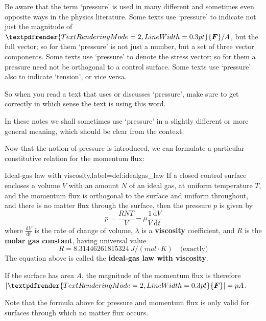 \documentclass[a4paper,12pt,%
onecolumn,oneside,titlepage,%
british%
]{memoir}
\providecommand{\href}[2]{#2}
\renewcommand*{\bm}[1]{\textpdfrender{TextRenderingMode=2,LineWidth=0.3pt}{\boldsymbol{#1}}}
\newcommand*{\di}{\mathrm{d}}%
\DeclarePairedDelimiter\abs{\lvert}{\rvert}
\renewcommand*{\|}[1][]{\nonscript\:#1\vert\nonscript\:\mathopen{}}
\newcommand*{\furl}[2]{\href{#1}{#2}\pagenote{\url{#1}}}
\newcommand*{\yN}{N}
\newcommand*{\yF}{\bm{F}}
\newcommand*{\yvis}{\mu}%
\newcommand*{\yte}{T}%
\begin{document}
\begin{warning}
  Be aware that the term \enquote*{pressure} is used in many different and sometimes even opposite ways in the physics literature. Some texts use \enquote*{pressure} to indicate not just the magnitude of $\yF/A$, but the full vector; so for them \enquote*{pressure} is not just a number, but a set of three vector components. Some texts use \enquote*{pressure} to denote the stress vector; so for them a pressure need not be orthogonal to a control surface. Some texts use \enquote*{pressure} also to indicate \enquote*{tension}, or vice versa.

  So when you read a text that uses or discusses \enquote*{pressure}, make sure to get correctly in which sense the text is using this word.

  In these notes we shall sometimes use \enquote*{pressure} in a slightly different or more general meaning, which should be clear from the context.
\end{warning}


Now that the notion of pressure is introduced, we can formulate a particular constitutive relation for the momentum flux:

\begin{definition}{Ideal-gas law with viscosity,label={def:idealgas_law}}
  If a closed control surface encloses a volume $V$ with an amount $\yN$ of an ideal gas, at uniform temperature $\yte$, and the momentum flux is orthogonal to the surface and uniform throughout, and there is no matter flux through the surface, then the pressure $p$ is given by
  \begin{equation}
    \label{eq:ideal_gas_p}
    p = \frac{R \yN \yte}{V}  - \yvis \frac{1}{V}\frac{\di V}{\di t}
  \end{equation}
  where $\frac{\di V}{\di t}$ is the rate of change of volume, $\lambda$ is a \textbf{viscosity} coefficient, and $R$ is the \furl{https://doi.org/10.1351/goldbook.G02579}{\textbf{molar gas constant}}, having universal value
  \begin{equation*}
    R = \qty{8.31446261815324}{J/(mol\cdot K)}\quad\text{(exactly)}
  \end{equation*}
The equation above is called the \textbf{ideal-gas law with viscosity}.

  \smallskip

  If the surface has area $A$, the magnitude of the momentum flux is therefore $\abs{\yF} = p A$.

\end{definition}
Note that the formula above for pressure and momentum flux is only valid for surfaces through which no matter flux occurs.
\end{document}
